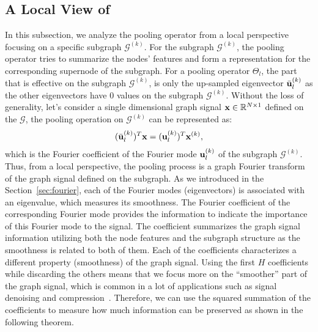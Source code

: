 \documentclass[sigconf]{acmart}
\newcommand{\pooling}{{\sf {EigenPooling}}}
\begin{document}
\subsection{A Local View of \pooling}
\label{sec:local}

In this subsection, we analyze the pooling operator from a local perspective focusing on a specific subgraph $\mathcal{G}^{(k)}$. For the subgraph $\mathcal{G}^{(k)}$, the pooling operator tries to summarize the nodes' features and form a representation for the corresponding supernode of the subgraph. For a pooling operator $\Theta_l$, the part that is effective on the subgraph $\mathcal{G}^{(k)}$, is only the up-sampled eigenvector $\bar{\bf u}^{(k)}_l$ as the other eigenvectors have $0$ values on the subgraph $\mathcal{G}^{(k)}$. Without the loss of generality, let's consider a single dimensional graph signal ${\bf x} \in \mathbb{R}^{N\times 1}$ defined on the $\mathcal{G}$, the pooling operation on $\mathcal{G}^{(k)}$ can be represented as:
\begin{align}
    (\bar{\bf u}^{(k)}_l )^T  {\bf x} = ({\bf u}^{(k)}_l)^T{\bf x}^{(k)},
\end{align}
which is the Fourier coefficient of the Fourier mode ${\bf u}^{(k)}_l$ of the subgraph $\mathcal{G}^{(k)}$. Thus, from a local perspective, the pooling process is a graph Fourier transform of the graph signal defined on the subgraph. As we introduced in the Section~\ref{sec:fourier}, each of the Fourier modes (eigenvectors) is associated with an eigenvalue, which measures its smoothness. The Fourier coefficient of the corresponding Fourier mode provides the information to indicate the importance of this Fourier mode to the signal. The coefficient summarizes the graph signal information utilizing both the node features and the subgraph structure as the smoothness is related to both of them. Each of the coefficients characterizes a different property (smoothness) of the graph signal. Using the first $H$ coefficients while discarding the others means that we focus more on the ``smoother'' part of the graph signal, which is common in a lot of applications such as signal denoising and compression~\cite{tremblay2016subgraph,chen2014signal,narang2012perfect}. Therefore, we can use the squared summation of the coefficients to measure how much information can be preserved as shown in the following theorem.  
\end{document}
